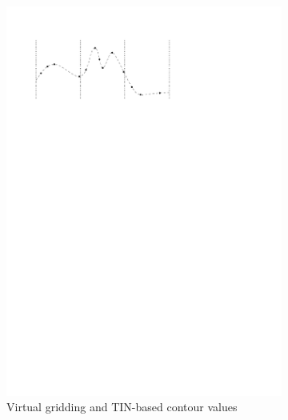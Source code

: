 \begin{figure}
\begin{subfigure}[b]{0.3\linewidth}
    \includegraphics[width=\textwidth,page=3]{figs/virtualgridding.pdf}
    \caption{Virtual gridding and TIN-based contour values}\label{fig:fr:vg:b}
  \end{subfigure}
  \qquad
  \begin{subfigure}[b]{0.3\linewidth}
    \centering

\end{subfigure}
\end{figure}
